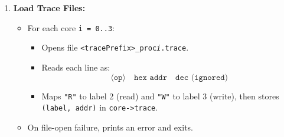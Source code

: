 \documentclass{article}
\begin{document}
\begin{itemize}
\begin{enumerate}
  \item \textbf{Load Trace Files:}
    \begin{itemize}
      \item For each core \texttt{i = 0..3}:
        \begin{itemize}
          \item Opens file \texttt{<tracePrefix>\_proc\textit{i}.trace}.
          \item Reads each line as:
            \[
              \langle \texttt{op} \rangle \quad  
              \texttt{hex addr} \quad  
              \texttt{dec (ignored)}
            \]
          \item Maps \texttt{"R"} to label 2 (read) and \texttt{"W"} to label 3 (write), then stores \texttt{(label, addr)} in \texttt{core->trace}.
        \end{itemize}
      \item On file-open failure, prints an error and exits.
    \end{itemize}


\end{enumerate}
\end{itemize}
\end{document}
